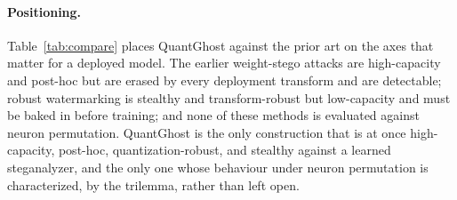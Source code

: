 \documentclass[a4paper,fleqn]{cas-dc}
\theoremstyle{plain}
\theoremstyle{remark}
\newcommand{\sys}{\mbox{QuantGhost}}
\begin{document}
\paragraph{Positioning.} Table~\ref{tab:compare} places \sys{} against the prior art on
the axes that matter for a deployed model. The earlier weight-stego attacks are
high-capacity and post-hoc but are erased by every deployment transform and are
detectable; robust watermarking is stealthy and transform-robust but low-capacity and
must be baked in before training; and none of these methods is evaluated against neuron
permutation. \sys{} is the only construction that is at once high-capacity, post-hoc,
quantization-robust, and stealthy against a learned steganalyzer, and the only one whose
behaviour under neuron permutation is characterized, by the trilemma, rather than left
open.
\end{document}
